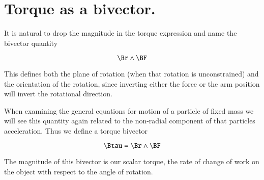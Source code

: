 \section{Torque as a bivector.}

It is natural to drop the magnitude in the torque expression and name the
bivector quantity

\[
   \Br \wedge \BF
\]

This defines both the plane of rotation (when that rotation is unconstrained) and the orientation of the rotation, since inverting either the force or the arm position will invert the rotational direction.

When examining the general equations for motion of a particle of fixed mass we will see this quantity again related to the non-radial component of that particles acceleration.  Thus we define a torque bivector

\[
\Btau = \Br \wedge \BF
\]

The magnitude of this bivector is our scalar torque, the rate of change of work on the object with respect to the angle of rotation.
